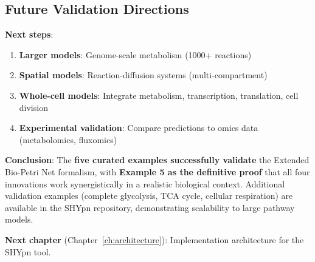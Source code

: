 \subsection{Future Validation Directions}
\label{subsec:future-validation}

\textbf{Next steps}:

\begin{enumerate}
    \item \textbf{Larger models}: Genome-scale metabolism (1000+ reactions)
    \item \textbf{Spatial models}: Reaction-diffusion systems (multi-compartment)
    \item \textbf{Whole-cell models}: Integrate metabolism, transcription, translation, cell division
    \item \textbf{Experimental validation}: Compare predictions to omics data (metabolomics, fluxomics)
\end{enumerate}

\textbf{Conclusion}: The \textbf{five curated examples successfully validate} the Extended Bio-Petri Net formalism, with \textbf{Example 5 as the definitive proof} that all four innovations work synergistically in a realistic biological context. Additional validation examples (complete glycolysis, TCA cycle, cellular respiration) are available in the SHYpn repository, demonstrating scalability to large pathway models.

\textbf{Next chapter} (Chapter~\ref{ch:architecture}): Implementation architecture for the SHYpn tool.
